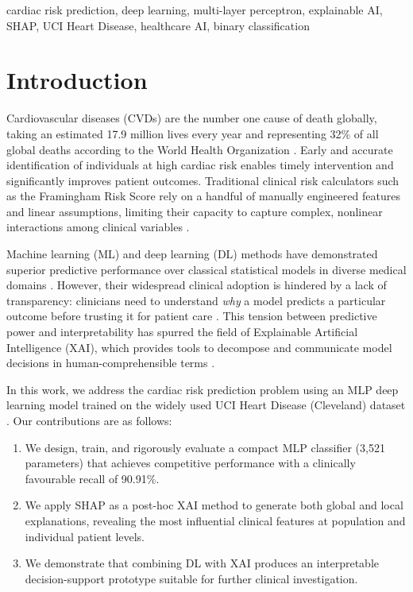 \documentclass[conference]{IEEEtran}
\begin{document}
\begin{IEEEkeywords}
cardiac risk prediction, deep learning, multi-layer perceptron, explainable AI, SHAP, UCI Heart Disease, healthcare AI, binary classification
\end{IEEEkeywords}

\section{Introduction}

Cardiovascular diseases (CVDs) are the number one cause of death globally, taking an estimated 17.9 million lives every year and representing 32\% of all global deaths according to the World Health Organization \cite{who2021cvd}. Early and accurate identification of individuals at high cardiac risk enables timely intervention and significantly improves patient outcomes. Traditional clinical risk calculators such as the Framingham Risk Score rely on a handful of manually engineered features and linear assumptions, limiting their capacity to capture complex, nonlinear interactions among clinical variables \cite{wilson1998framingham}.

Machine learning (ML) and deep learning (DL) methods have demonstrated superior predictive performance over classical statistical models in diverse medical domains \cite{obermeyer2016predicting, rajpurkar2017chexnet}. However, their widespread clinical adoption is hindered by a lack of transparency: clinicians need to understand \textit{why} a model predicts a particular outcome before trusting it for patient care \cite{tjoa2020survey}. This tension between predictive power and interpretability has spurred the field of Explainable Artificial Intelligence (XAI), which provides tools to decompose and communicate model decisions in human-comprehensible terms \cite{arrieta2020explainable}.

In this work, we address the cardiac risk prediction problem using an MLP deep learning model trained on the widely used UCI Heart Disease (Cleveland) dataset \cite{detrano1989international}. Our contributions are as follows:

\begin{enumerate}
    \item We design, train, and rigorously evaluate a compact MLP classifier (3,521 parameters) that achieves competitive performance with a clinically favourable recall of 90.91\%.
    \item We apply SHAP \cite{lundberg2017unified} as a post-hoc XAI method to generate both global and local explanations, revealing the most influential clinical features at population and individual patient levels.
    \item We demonstrate that combining DL with XAI produces an interpretable decision-support prototype suitable for further clinical investigation.
\end{enumerate}
\end{document}
